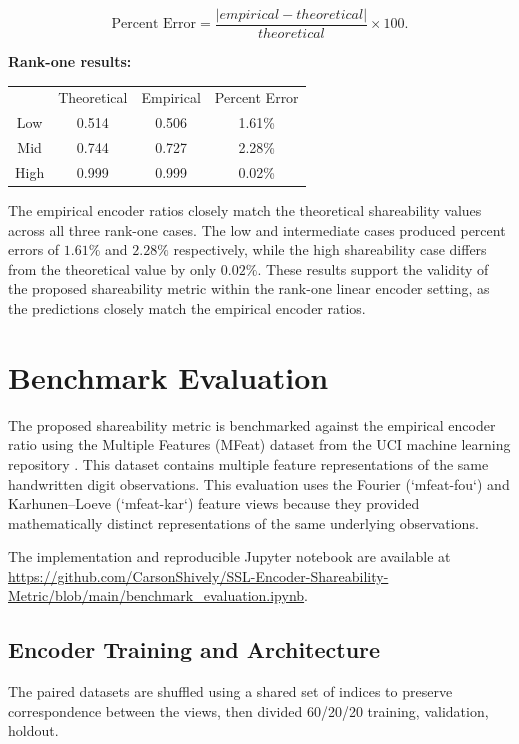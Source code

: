 \documentclass{article}
\begin{document}
\[
\text{Percent Error} = \frac{|empirical - theoretical|}{theoretical} \times 100.
\]

\textbf{Rank-one results:}

\begin{table}[H]
    \centering
    \begin{tabular}{c|c|c|c}
        & Theoretical & Empirical & Percent Error \\
        Low & 0.514 & 0.506 & 1.61\% \\
        Mid & 0.744 & 0.727 & 2.28\% \\
        High & 0.999 & 0.999 & 0.02\% \\
    \end{tabular}
\end{table}

The empirical encoder ratios closely match the theoretical shareability values across all three rank-one cases. The low and intermediate cases produced percent errors of \(1.61\%\) and \(2.28\%\) respectively, while the high shareability case differs from the theoretical value by only \(0.02\%\). These results support the validity of the proposed shareability metric within the rank-one linear encoder setting, as the predictions closely match the empirical encoder ratios.

\section{Benchmark Evaluation}

The proposed shareability metric is benchmarked against the empirical encoder ratio using the Multiple Features (MFeat) dataset from the UCI machine learning repository \cite{multiple_features_72}. This dataset contains multiple feature representations of the same handwritten digit observations. This evaluation uses the Fourier (`mfeat-fou`) and Karhunen--Loeve (`mfeat-kar`) feature views because they provided mathematically distinct representations of the same underlying observations.

The implementation and reproducible Jupyter notebook are available at \url{https://github.com/CarsonShively/SSL-Encoder-Shareability-Metric/blob/main/benchmark_evaluation.ipynb}.

\subsection{Encoder Training and Architecture}

The paired datasets are shuffled using a shared set of indices to preserve correspondence between the views, then divided 60/20/20 training, validation, holdout.
\end{document}

